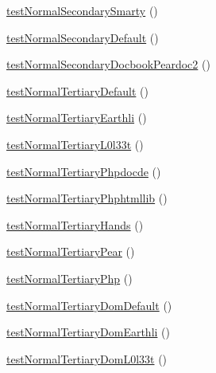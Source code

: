 \begin{DoxyCompactItemize}
\item 
\hyperlink{classtests__php_documentor_setup_clean_converter_name_piece_tests_a62ab5782ea41bd9c42c31e1e5edc724d}{test\-Normal\-Secondary\-Smarty} ()
\item 
\hyperlink{classtests__php_documentor_setup_clean_converter_name_piece_tests_a3c71202722e6898fbadee980c191927e}{test\-Normal\-Secondary\-Default} ()
\item 
\hyperlink{classtests__php_documentor_setup_clean_converter_name_piece_tests_a7808fa3f7ca0c827ef862c331ab4802f}{test\-Normal\-Secondary\-Docbook\-Peardoc2} ()
\item 
\hyperlink{classtests__php_documentor_setup_clean_converter_name_piece_tests_a23096a994c3f5587fe003b87d483e599}{test\-Normal\-Tertiary\-Default} ()
\item 
\hyperlink{classtests__php_documentor_setup_clean_converter_name_piece_tests_a7c00c80d35b3efe67b0aa11f45f72d10}{test\-Normal\-Tertiary\-Earthli} ()
\item 
\hyperlink{classtests__php_documentor_setup_clean_converter_name_piece_tests_abea39a920b2400c6861486c55dc5e288}{test\-Normal\-Tertiary\-L0l33t} ()
\item 
\hyperlink{classtests__php_documentor_setup_clean_converter_name_piece_tests_a0a6c5243741524c0f29b4c4d297bb637}{test\-Normal\-Tertiary\-Phpdocde} ()
\item 
\hyperlink{classtests__php_documentor_setup_clean_converter_name_piece_tests_a9fced369c8444eb5b7cfc2d1a1d366f1}{test\-Normal\-Tertiary\-Phphtmllib} ()
\item 
\hyperlink{classtests__php_documentor_setup_clean_converter_name_piece_tests_a2d97ef3707c7e5133710245a3e6286a6}{test\-Normal\-Tertiary\-Hands} ()
\item 
\hyperlink{classtests__php_documentor_setup_clean_converter_name_piece_tests_ab2108e47804505b92e11f7c4d71642bb}{test\-Normal\-Tertiary\-Pear} ()
\item 
\hyperlink{classtests__php_documentor_setup_clean_converter_name_piece_tests_a7b2bc8a1f1b2e8b6b1ebe34c162242a4}{test\-Normal\-Tertiary\-Php} ()
\item 
\hyperlink{classtests__php_documentor_setup_clean_converter_name_piece_tests_af062e38a094483e8e38dd20cfabc6701}{test\-Normal\-Tertiary\-Dom\-Default} ()
\item 
\hyperlink{classtests__php_documentor_setup_clean_converter_name_piece_tests_a63e9796ac3d159469179d8dc88b0660c}{test\-Normal\-Tertiary\-Dom\-Earthli} ()
\item 
\hyperlink{classtests__php_documentor_setup_clean_converter_name_piece_tests_a7f71e667240c3c8c5fb2f830ead1d15d}{test\-Normal\-Tertiary\-Dom\-L0l33t} ()

\end{DoxyCompactItemize}
